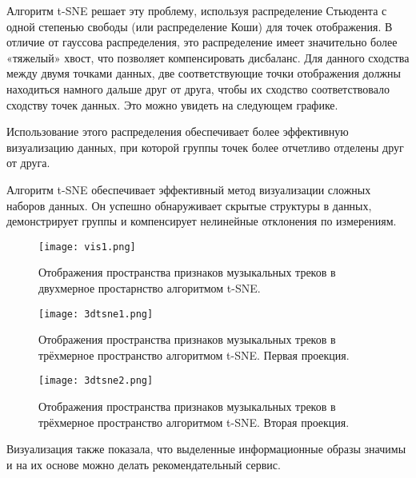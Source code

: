 Алгоритм t-SNE решает эту проблему, используя распределение Стьюдента с одной степенью свободы (или распределение Коши) для точек отображения. В отличие от гауссова распределения, это распределение имеет значительно более «тяжелый» хвост, что позволяет компенсировать дисбаланс. Для данного сходства между двумя точками данных, две соответствующие точки отображения должны находиться намного дальше друг от друга, чтобы их сходство соответствовало сходству точек данных. Это можно увидеть на следующем графике.

Использование этого распределения обеспечивает более эффективную визуализацию данных, при которой группы точек более отчетливо отделены друг от друга.

Алгоритм t-SNE обеспечивает эффективный метод визуализации сложных наборов данных. Он успешно обнаруживает скрытые структуры в данных, демонстрирует группы и компенсирует нелинейные отклонения по измерениям.

\begin{figure}[!h]
\centering
  \texttt{[image: vis1.png]}
  \caption{Отображения пространства  признаков музыкальных треков в двухмерное простарнство алгоритмом t-SNE.}
  \label{fig:results:2dtsne}
\end{figure}

\begin{figure}[!h]
\centering
  \texttt{[image: 3dtsne1.png]}
  \caption{Отображения пространства  признаков музыкальных треков в трёхмерное пространство алгоритмом t-SNE. Первая проекция. }
  \label{fig:results:2dtsne}
\end{figure}


\begin{figure}[!h]
\centering
  \texttt{[image: 3dtsne2.png]}
  \caption{Отображения пространства  признаков музыкальных треков в трёхмерное пространство алгоритмом t-SNE. Вторая проекция. }
  \label{fig:results:2dtsne}
\end{figure}

Визуализация также показала, что выделенные информационные образы значимы и на их основе можно делать рекомендательный сервис. 